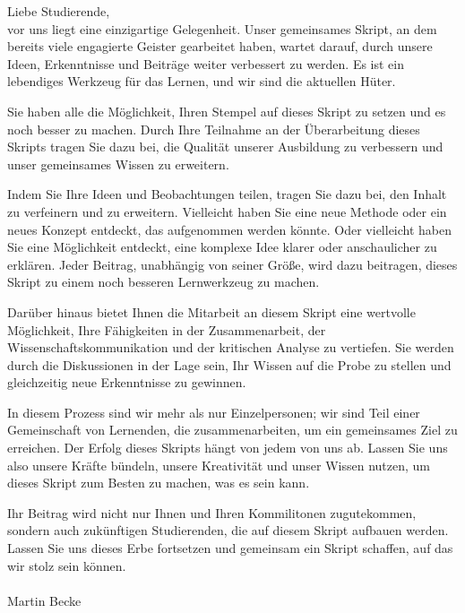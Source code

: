 \documentclass[a4paper,10pt]{book}
\begin{document}
Liebe Studierende,\\ vor uns liegt eine einzigartige Gelegenheit. Unser gemeinsames Skript, an dem bereits viele engagierte Geister gearbeitet haben, wartet darauf, durch unsere Ideen, Erkenntnisse und Beiträge weiter verbessert zu werden. Es ist ein lebendiges Werkzeug für das Lernen, und wir sind die aktuellen Hüter.

Sie haben alle die Möglichkeit, Ihren Stempel auf dieses Skript zu setzen und es noch besser zu machen. Durch Ihre Teilnahme an der Überarbeitung dieses Skripts tragen Sie dazu bei, die Qualität unserer Ausbildung zu verbessern und unser gemeinsames Wissen zu erweitern.

Indem Sie Ihre Ideen und Beobachtungen teilen, tragen Sie dazu bei, den Inhalt zu verfeinern und zu erweitern. Vielleicht haben Sie eine neue Methode oder ein neues Konzept entdeckt, das aufgenommen werden könnte. Oder vielleicht haben Sie eine Möglichkeit entdeckt, eine komplexe Idee klarer oder anschaulicher zu erklären. Jeder Beitrag, unabhängig von seiner Größe, wird dazu beitragen, dieses Skript zu einem noch besseren Lernwerkzeug zu machen.

Darüber hinaus bietet Ihnen die Mitarbeit an diesem Skript eine wertvolle Möglichkeit, Ihre Fähigkeiten in der Zusammenarbeit, der Wissenschaftskommunikation und der kritischen Analyse zu vertiefen. Sie werden durch die Diskussionen in der Lage sein, Ihr Wissen auf die Probe zu stellen und gleichzeitig neue Erkenntnisse zu gewinnen.

In diesem Prozess sind wir mehr als nur Einzelpersonen; wir sind Teil einer Gemeinschaft von Lernenden, die zusammenarbeiten, um ein gemeinsames Ziel zu erreichen. Der Erfolg dieses Skripts hängt von jedem von uns ab. Lassen Sie uns also unsere Kräfte bündeln, unsere Kreativität und unser Wissen nutzen, um dieses Skript zum Besten zu machen, was es sein kann.

Ihr Beitrag wird nicht nur Ihnen und Ihren Kommilitonen zugutekommen, sondern auch zukünftigen Studierenden, die auf diesem Skript aufbauen werden. Lassen Sie uns dieses Erbe fortsetzen und gemeinsam ein Skript schaffen, auf das wir stolz sein können.
\\\\
Martin Becke
\newpage
\end{document}
